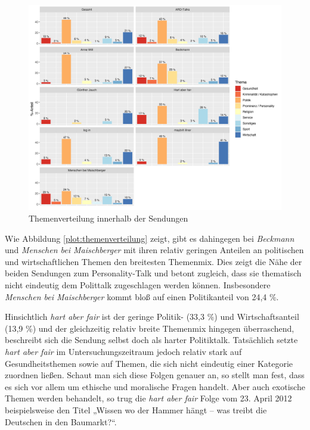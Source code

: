 \begin{figure}[ht]
	\centering
	\includegraphics[width=1\textwidth]{daten/grafiken/plot_themenverteilung.png}
	\caption{Themenverteilung innerhalb der Sendungen}
	\label{plot:themenverteilung}
\end{figure}

Wie Abbildung \vref{plot:themenverteilung} zeigt, gibt es dahingegen bei \textit{Beckmann} und \textit{Menschen bei Maischberger} mit ihren relativ geringen Anteilen an politischen und wirtschaftlichen Themen den breitesten Themenmix. Dies zeigt die Nähe der beiden Sendungen zum Personality-Talk und betont zugleich, dass sie thematisch nicht eindeutig dem Polittalk zugeschlagen werden können. Insbesondere \textit{Menschen bei Maischberger} kommt bloß auf einen Politikanteil von 24,4 \%.

Hinsichtlich \textit{hart aber fair} ist der geringe Politik- (33,3 \%) und Wirtschaftsanteil (13,9 \%) und der gleichzeitig relativ breite Themenmix hingegen überraschend, beschreibt sich die Sendung selbst doch als harter Politiktalk. Tatsächlich setzte \textit{hart aber fair} im Untersuchungszeitraum jedoch relativ stark auf Gesundheitsthemen sowie auf Themen, die sich nicht eindeutig einer Kategorie zuordnen ließen. Schaut man sich diese Folgen genauer an, so stellt man fest, dass es sich vor allem um ethische und moralische Fragen handelt. Aber auch exotische Themen werden behandelt, so trug die \textit{hart aber fair} Folge vom 23. April 2012 beispielsweise den Titel „Wissen wo der Hammer hängt – was treibt die Deutschen in den Baumarkt?“.


